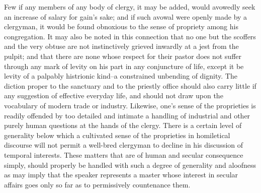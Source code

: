 \documentclass[12pt]{report}
\begin{document}
Few if any members of any body of clergy, it may be added, would
avowedly seek an increase of salary for gain's sake; and if such avowal
were openly made by a clergyman, it would be found obnoxious to the
sense of propriety among his congregation. It may also be noted in this
connection that no one but the scoffers and the very obtuse are not
instinctively grieved inwardly at a jest from the pulpit; and that there
are none whose respect for their pastor does not suffer through any mark
of levity on his part in any conjuncture of life, except it be levity
of a palpably histrionic kind--a constrained unbending of dignity. The
diction proper to the sanctuary and to the priestly office should also
carry little if any suggestion of effective everyday life, and should
not draw upon the vocabulary of modern trade or industry. Likewise,
one's sense of the proprieties is readily offended by too detailed and
intimate a handling of industrial and other purely human questions at
the hands of the clergy. There is a certain level of generality below
which a cultivated sense of the proprieties in homiletical discourse
will not permit a well-bred clergyman to decline in his discussion
of temporal interests. These matters that are of human and secular
consequence simply, should properly be handled with such a degree of
generality and aloofness as may imply that the speaker represents
a master whose interest in secular affairs goes only so far as to
permissively countenance them.
\end{document}
